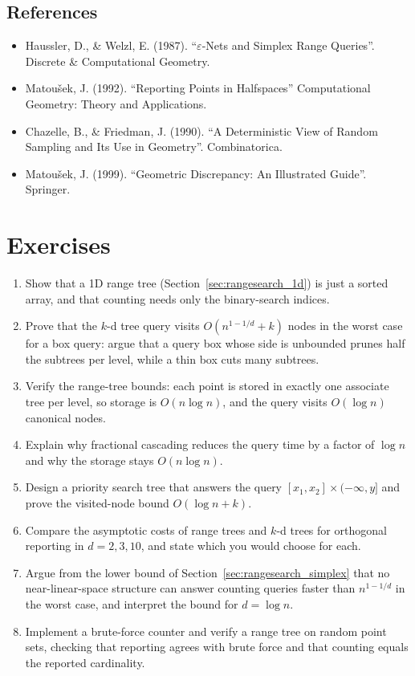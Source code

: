 \subsection{References}
\begin{itemize}
    \item Haussler, D., \& Welzl, E. (1987). ``$\varepsilon$-Nets and Simplex
      Range Queries''. Discrete \& Computational Geometry.
    \item Matou\v{s}ek, J. (1992). ``Reporting Points in Halfspaces''
      Computational Geometry: Theory and Applications.
    \item Chazelle, B., \& Friedman, J. (1990). ``A Deterministic View of
      Random Sampling and Its Use in Geometry''. Combinatorica.
    \item Matou\v{s}ek, J. (1999). ``Geometric Discrepancy: An Illustrated
      Guide''. Springer.
\end{itemize}

\section{Exercises}
\label{sec:rangesearch_exercises}

\begin{enumerate}
  \item Show that a 1D range tree (Section~\ref{sec:rangesearch_1d}) is
    just a sorted array, and that counting needs only the binary-search
    indices.
  \item Prove that the $k$-d tree query visits $O(n^{1-1/d} + k)$ nodes in
    the worst case for a box query: argue that a query box whose side is
    unbounded prunes half the subtrees per level, while a thin box cuts
    many subtrees.
  \item Verify the range-tree bounds: each point is stored in exactly one
    associate tree per level, so storage is $O(n \log n)$, and the query
    visits $O(\log n)$ canonical nodes.
  \item Explain why fractional cascading reduces the query time by a
    factor of $\log n$ and why the storage stays $O(n \log n)$.
  \item Design a priority search tree that answers the query
    $[x_1, x_2] \times (-\infty, y]$ and prove the visited-node bound
    $O(\log n + k)$.
  \item Compare the asymptotic costs of range trees and $k$-d trees for
    orthogonal reporting in $d = 2, 3, 10$, and state which you would
    choose for each.
  \item Argue from the lower bound of Section~\ref{sec:rangesearch_simplex}
    that no near-linear-space structure can answer counting queries
    faster than $n^{1-1/d}$ in the worst case, and interpret the bound for
    $d = \log n$.
  \item Implement a brute-force counter and verify a range tree on random
    point sets, checking that reporting agrees with brute force and that
    counting equals the reported cardinality.
\end{enumerate}

